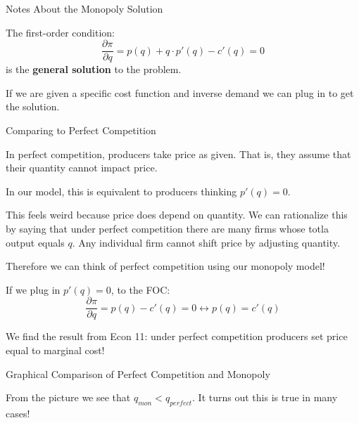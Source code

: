 \documentclass[aspectratio=169]{beamer}
\newenvironment{wideitemize}{\itemize\addtolength{\itemsep}{10pt}}{\enditemize}
\begin{document}
\begin{frame}{Notes About the Monopoly Solution}
\begin{wideitemize}
        \item  The first-order condition:
     \[\frac{\partial \pi}{\partial q} = p(q) +q\cdot p'(q) - c'(q) =0\]
     is the \textbf{general solution} to the problem.
     \item If we are given a specific cost function and inverse demand we can plug in to get the solution.
    
\end{wideitemize}
   
\end{frame}

\begin{frame}{Comparing to Perfect Competition}
\begin{wideitemize}
        \item In perfect competition, producers take price as given. That is, they assume that their quantity cannot impact price.
        \item In our model, this is equivalent to producers thinking $p'(q)=0$. 
        \item This feels weird because price does depend on quantity. We can rationalize this by saying that under perfect competition there are many firms whose totla output equals $q$. Any individual firm cannot shift price by adjusting quantity.
        \item Therefore we can think of perfect competition using our monopoly model!
        \item If we plug in $p'(q)=0$, to the FOC:
        \[\frac{\partial \pi}{\partial q} = p(q) -c'(q)=0 \leftrightarrow p(q) = c'(q)\]
        \item We find the result from Econ 11: under perfect competition producers set price equal to marginal cost!
\end{wideitemize}
\end{frame}

\begin{frame}{Graphical Comparison of Perfect Competition and Monopoly}

From the picture we see that $q_{mon}<q_{perfect}$. It turns out this is true in many cases!
\end{frame}
\end{document}
